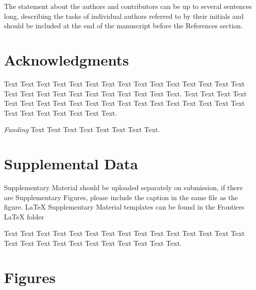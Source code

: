 \documentclass{frontiersSCNS} %
\begin{document}
The statement about the authors and contributors can be up to several sentences long, describing the tasks of individual authors referred to by their initials and should be included at the end of the manuscript before the References section.



\section*{Acknowledgments}
Text Text Text Text Text Text  Text Text Text Text Text Text Text Text  Text Text Text Text Text Text Text Text Text  Text Text Text. Text Text Text Text Text Text  Text Text Text Text Text Text Text Text  Text Text Text Text Text Text Text Text Text  Text Text Text. 


\textit{Funding\textcolon} Text Text Text Text Text Text  Text Text.



\section*{Supplemental Data}
Supplementary Material should be uploaded separately on submission, if there are Supplementary Figures, please include the caption in the same file as the figure. LaTeX Supplementary Material templates can be found in the Frontiers LaTeX folder

Text Text Text Text Text Text  Text Text Text Text Text Text Text Text  Text Text Text Text Text Text Text Text Text  Text Text Text.

\pagebreak



\pagebreak

\section*{Figures}
\end{document}
